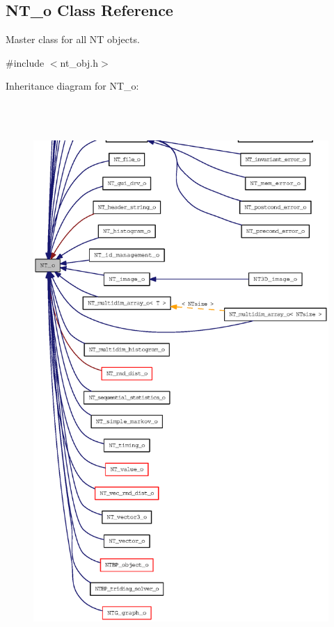 \subsection{NT\_\-o Class Reference}
\label{class_n_t__o}


Master class for all NT objects.  




{\ttfamily \#include $<$nt\_\-obj.h$>$}



Inheritance diagram for NT\_\-o:
\nopagebreak
\begin{figure}[H]
\begin{center}
\leavevmode
\includegraphics[height=600pt]{class_n_t__o__inherit__graph}
\end{center}
\end{figure}
